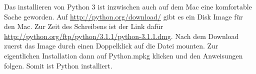 \begin{MAC}

\noindent
Das installieren von Python 3 ist inzwischen auch auf dem Mac eine komfortable Sache geworden. Auf \href{http://python.org/download/}{http://python.org/download/} gibt es ein Disk Image für den Mac. Zur Zeit des Schreibens ist der Link dafür 
\\
\href{http://python.org/ftp/python/3.1.1/python-3.1.1.dmg}{http://python.org/ftp/python/3.1.1/python-3.1.1.dmg}. Nach dem Download zuerst das Image durch einen Doppelklick auf die Datei mounten. Zur eigentlichen Installation dann auf Python.mpkg klicken und den Anweisungen folgen. Somit ist Python installiert.









\end{MAC}
